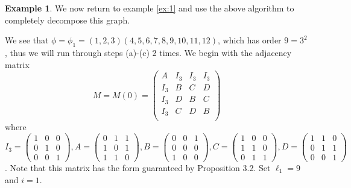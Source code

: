 \documentclass[preprint,12pt]{elsarticle}
\theoremstyle{definition}
\newtheorem{example}[thm]{Example}
\theoremstyle{remark}
\begin{document}
\begin{example}
We now return to example \ref{ex:1} and use the above algorithm to completely decompose this graph.

We see that $\phi=\phi_1=(1,2,3)(4,5,6,7,8,9,10,11,12)$, which has order $9=3^2$, thus we will run through steps (a)-(c) 2 times. We begin with the adjacency matrix $$M=M(0)=\left(\begin{matrix}
A & I_3 & I_3 & I_3\\
I_3 & B & C & D\\
I_3 & D & B & C\\
I_3 & C & D & B\\
\end{matrix}\right)$$ where $I_3=\left(\begin{matrix}
1 & 0 & 0\\
0 & 1 & 0 \\
0 & 0 & 1
\end{matrix}\right),A=\left(\begin{matrix}
0 & 1 & 1\\
1 & 0 & 1 \\
1 & 1 & 0
\end{matrix}\right),B=\left(\begin{matrix}
0 & 0 & 1\\
0 & 0 & 0 \\
1 & 0 & 0
\end{matrix}\right),C=\left(\begin{matrix}
1 & 0 & 0\\
1 & 1 & 0 \\
0 & 1 & 1
\end{matrix}\right),D=\left(\begin{matrix}
1 & 1 & 0\\
0 & 1 & 1 \\
0 & 0 & 1
\end{matrix}\right)$. Note that this matrix has the form guaranteed by Proposition 3.2. Set $\ell_1=9$ and $i=1$.


\end{example}
\end{document}
